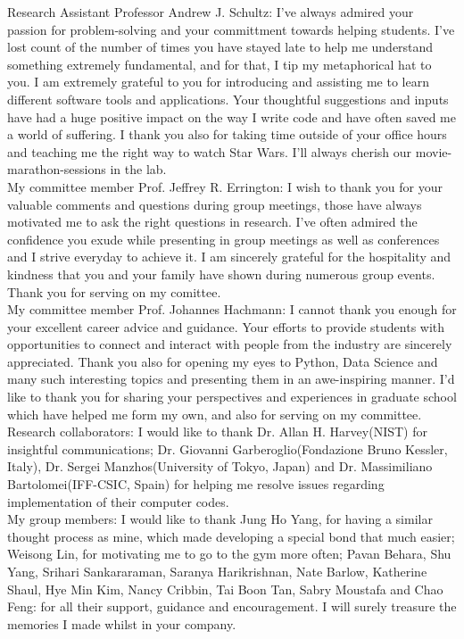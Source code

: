 \noindent Research Assistant Professor Andrew J. Schultz: I've always admired your passion for problem-solving and your committment towards helping students. I've lost count of the number of times you have stayed late to help me understand something extremely fundamental, and for that, I tip my metaphorical hat to you. I am extremely grateful to you for introducing and assisting me to learn different software tools and applications. Your thoughtful suggestions and inputs have had a huge positive impact on the way I write code and have often saved me a world of suffering. I thank you also for taking time outside of your office hours and teaching me the right way to watch Star Wars. I'll always cherish our movie-marathon-sessions in the lab.\\

\noindent My committee member Prof. Jeffrey R. Errington: I wish to thank you for your valuable comments and questions during group meetings, those have always motivated me to ask the right questions in research. I've often admired the confidence you exude while presenting in group meetings as well as conferences and I strive everyday to achieve it. I am sincerely grateful for the hospitality and kindness that you and your family have shown during numerous group events.  Thank you for serving on my comittee.\\

\noindent My committee member Prof. Johannes Hachmann: I cannot thank you enough for your excellent career advice and guidance. Your efforts to provide students with opportunities to connect and interact with people from the industry are sincerely appreciated. Thank you also for opening my eyes to Python, Data Science and many such interesting topics and presenting them in an awe-inspiring manner. I'd like to thank you for sharing your perspectives and experiences in graduate school which have helped me form my own, and also for serving on my committee.\\

\noindent Research collaborators: I would like to thank Dr. Allan H. Harvey(NIST) for insightful communications; Dr. Giovanni Garberoglio(Fondazione Bruno Kessler, Italy), Dr. Sergei Manzhos(University of Tokyo, Japan) and Dr. Massimiliano Bartolomei(IFF-CSIC, Spain) for helping me resolve issues regarding implementation of their computer codes.\\

\noindent My group members: I would like to thank Jung Ho Yang, for having a similar thought process as mine, which made developing a special bond that much easier; Weisong Lin, for motivating me to go to the gym more often; Pavan Behara, Shu Yang, Srihari Sankararaman, Saranya Harikrishnan, Nate Barlow, Katherine Shaul, Hye Min Kim, Nancy Cribbin, Tai Boon Tan, Sabry Moustafa and Chao Feng: for all their support, guidance and encouragement. I will surely treasure the memories I made whilst in your company.\\

